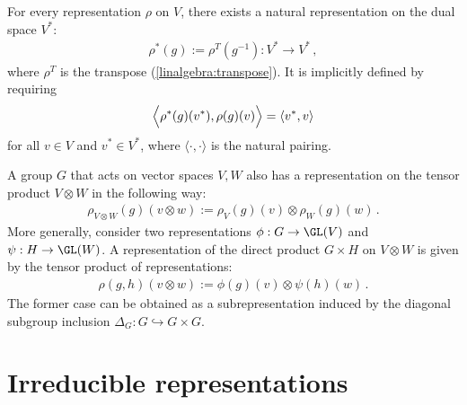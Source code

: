     \begin{example}
        For every representation $\rho$ on $V$, there exists a natural representation on the dual space $V^*$:
        \begin{gather}
            \rho^*(g) := \rho^T(g^{-1}):V^*\rightarrow V^*\,,
        \end{gather}
        where $\rho^T$ is the transpose (\cref{linalgebra:transpose}). It is implicitly defined by requiring
        \begin{gather}
            \Bigl\langle\rho^*(g)(v^*),\rho(g)(v)\Bigr\rangle = \langle v^*,v \rangle
        \end{gather}
        for all $v\in V$ and $v^*\in V^*$, where $\langle\cdot,\cdot\rangle$ is the natural pairing.
    \end{example}

    \begin{example}
        A group $G$ that acts on vector spaces $V,W$ also has a representation on the tensor product $V\otimes W$ in the following way:
        \begin{gather}
            \rho_{V\otimes W}(g)(v\otimes w) := \rho_V(g)(v)\otimes\rho_W(g)(w)\,.
        \end{gather}
        More generally, consider two representations $\phi:G\rightarrow\GL(V)$ and $\psi:H\rightarrow\GL(W)$. A representation of the direct product $G\times H$ on $V\otimes W$ is given by the tensor product of representations:
        \begin{gather}
            \rho(g,h)(v\otimes w) := \phi(g)(v)\otimes\psi(h)(w)\,.
        \end{gather}
        The former case can be obtained as a subrepresentation induced by the diagonal subgroup inclusion $\Delta_G:G\hookrightarrow G\times G$.
    \end{example}


\section{Irreducible representations}\label{section:irreducibility}

